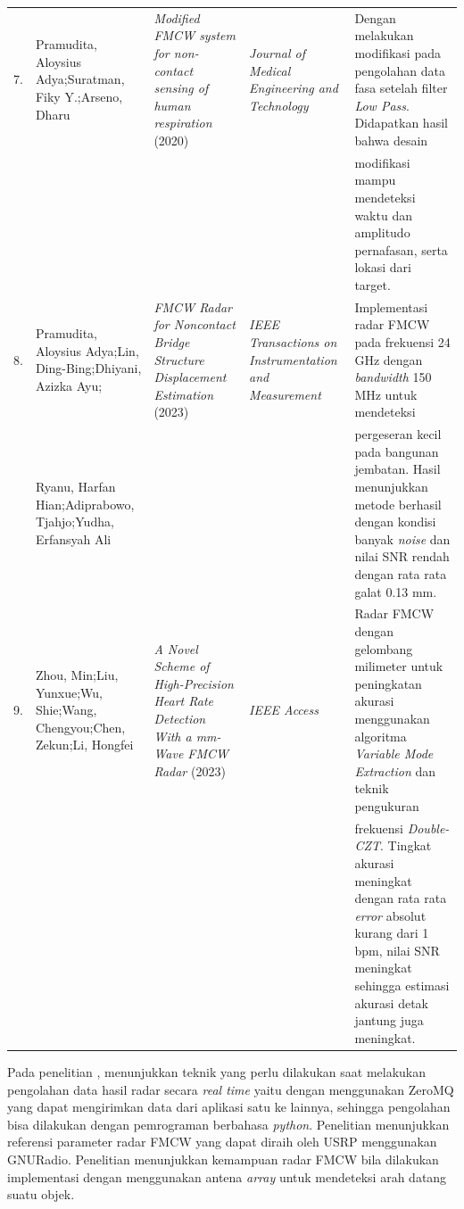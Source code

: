 \begin{center}
\begin{longtable}{|p{0.5cm}|p{2cm}|p{3cm}|p{2.5cm}|p{3cm}|}
	7. & Pramudita, Aloysius Adya;\newline Suratman, Fiky Y.;\newline Arseno, Dharu
	& \textit{Modified FMCW system for non-contact sensing of human respiration} (2020) \cite{Pramudita2020}
	& \textit{Journal of Medical Engineering and Technology}
	& Dengan melakukan modifikasi pada pengolahan data fasa setelah filter \textit{Low Pass}. Didapatkan hasil bahwa desain\\
	&
	&
	&
	&
	 modifikasi mampu mendeteksi waktu dan amplitudo pernafasan, serta lokasi dari target. 
	\\
	\hline
	8. & Pramudita, Aloysius Adya;\newline Lin, Ding-Bing;\newline Dhiyani, Azizka Ayu;
	& \textit{FMCW Radar for Noncontact Bridge Structure Displacement Estimation} (2023) \cite{Pramudita2023}
	& \textit{IEEE Transactions on Instrumentation and Measurement}
	& Implementasi radar FMCW pada frekuensi 24 GHz dengan \textit{bandwidth} 150 MHz untuk mendeteksi \\
	& Ryanu, Harfan Hian;\newline Adiprabowo, Tjahjo;\newline Yudha, Erfansyah Ali
	&
	&
	&
	pergeseran kecil pada bangunan jembatan. Hasil menunjukkan metode berhasil dengan kondisi banyak \textit{noise} dan nilai SNR rendah dengan rata rata galat 0.13 mm.
	\\ \hline
	9. & Zhou, Min;\newline Liu, Yunxue;\newline Wu, Shie;\newline Wang, Chengyou;\newline Chen, Zekun;\newline Li, Hongfei
	& \textit{A Novel Scheme of High-Precision Heart Rate Detection With a mm-Wave FMCW Radar} (2023) \cite{Zhou2023}
	& \textit{IEEE Access}
	& Radar FMCW dengan gelombang milimeter untuk peningkatan akurasi menggunakan algoritma \textit{Variable Mode Extraction} dan teknik pengukuran \\
	&
	&
	&
	&
	frekuensi \textit{Double-CZT}. Tingkat akurasi meningkat dengan rata rata \textit{error} absolut kurang dari 1 bpm, nilai SNR meningkat sehingga estimasi akurasi detak jantung juga meningkat.
	\\ \hline
	\end{longtable}
\end{center}

Pada penelitian \cite{Lenz2022}, menunjukkan teknik yang perlu dilakukan saat melakukan pengolahan data hasil radar secara \textit{real time} yaitu dengan menggunakan ZeroMQ yang dapat mengirimkan data dari aplikasi satu ke lainnya, sehingga pengolahan bisa dilakukan dengan pemrograman berbahasa \textit{python}. Penelitian \cite{Wankhede2024} menunjukkan referensi parameter radar FMCW yang dapat diraih oleh USRP menggunakan GNURadio. Penelitian \cite{HilarioRe2021} menunjukkan kemampuan radar FMCW bila dilakukan implementasi dengan menggunakan antena \textit{array} untuk mendeteksi arah datang suatu objek.

